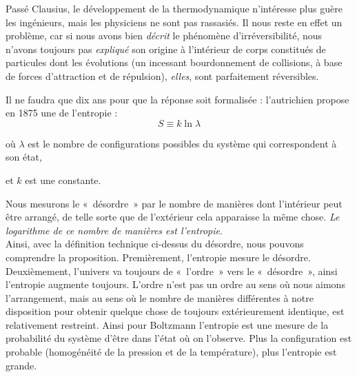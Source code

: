 		Passé Clausius, le développement de la thermodynamique n’intéresse plus guère les ingénieurs, mais les physiciens ne sont pas rassasiés. Il nous reste en effet un problème, car si nous avons bien \emph{décrit} le phénomène d’irréversibilité, nous n’avons toujours pas \emph{expliqué} son origine à l’intérieur de corps constitués de particules dont les évolutions (un incessant bourdonnement de collisions, à base de forces d’attraction et de répulsion), \emph{elles}, sont parfaitement réversibles.
		
		Il ne faudra que dix ans pour que la réponse soit formalisée : l’autrichien  propose en 1875 une  de l’entropie :
			\begin{equation}
				S \equiv k \ln \lambda
			\end{equation}
			\begin{equationterms}
				\item où \tab $\lambda$ \tab est le nombre de configurations possibles du système qui correspondent à son état,
				\item et \tab $k$ \tab est une constante.
			\end{equationterms}
		
		Nous mesurons le «~dés\-or\-dre~» par le nombre de manières dont l’intérieur peut être arrangé, de telle sorte que de l’extérieur cela apparaisse la même chose. \emph{Le logarithme de ce nombre de manières est l’entropie}.\\
Ainsi, avec la définition technique ci-dessus du désordre, nous pouvons comprendre la proposition. Premièrement, l’entropie mesure le désordre. Deuxièmement, l’univers va toujours de «~l’ordre~» vers le «~désordre~», ainsi l’entropie augmente toujours. L’ordre n’est pas un ordre au sens où nous aimons l’arrangement, mais au sens où le nombre de manières différentes à notre disposition pour obtenir quelque chose de toujours extérieurement identique, est relativement restreint.
		Ainsi pour Boltzmann l’entropie est une mesure de la probabilité du système d’être dans l’état où on l’observe. Plus la configuration est probable (homogénéité de la pression et de la température), plus l’entropie est grande.
		
